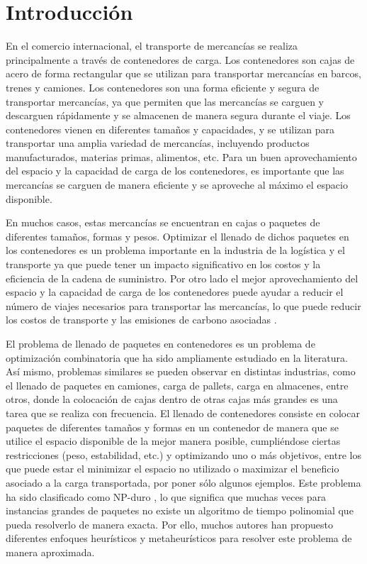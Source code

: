 \documentclass[openany]{article}
\begin{document}
\thispagestyle{empty}

\clearpage\thispagestyle{empty}\null\newpage %


\newpage




\section{Introducción} \label{sec: introducción}

En el comercio internacional, el transporte de mercancías se realiza principalmente a través de contenedores de carga. Los contenedores son cajas de acero de forma rectangular que se utilizan para transportar mercancías en barcos, trenes y camiones. Los contenedores son una forma eficiente y segura de transportar mercancías, ya que permiten que las mercancías se carguen y descarguen rápidamente y se almacenen de manera segura durante el viaje. Los contenedores vienen en diferentes tamaños y capacidades, y se utilizan para transportar una amplia variedad de mercancías, incluyendo productos manufacturados, materias primas, alimentos, etc. Para un buen aprovechamiento del espacio y la capacidad de carga de los contenedores, es importante que las mercancías se carguen de manera eficiente y se aproveche al máximo el espacio disponible.

En muchos casos, estas mercancías se encuentran en cajas o paquetes de diferentes tamaños, formas y pesos. Optimizar el llenado de dichos paquetes en los contenedores es un problema importante en la industria de la logística y el transporte ya que puede tener un impacto significativo en los costos y la eficiencia de la cadena de suministro. Por otro lado el mejor aprovechamiento del espacio y la capacidad de carga de los contenedores puede ayudar a reducir el número de viajes necesarios para transportar las mercancías, lo que puede reducir los costos de transporte y las emisiones de carbono asociadas \parencite{Parreo2008AMA}.

El problema de llenado de paquetes en contenedores es un problema de optimización combinatoria que ha sido ampliamente estudiado en la literatura. Así mismo, problemas similares se pueden observar en distintas industrias, como el llenado de paquetes en camiones, carga de pallets, carga en almacenes, entre otros, donde la colocación de cajas dentro de otras cajas más grandes es una tarea que se realiza con frecuencia. El llenado de contenedores consiste en colocar paquetes de diferentes tamaños y formas en un contenedor de manera que se utilice el espacio disponible de la mejor manera posible, cumpliéndose ciertas restricciones (peso, estabilidad, etc.) y optimizando uno o más objetivos, entre los que puede estar el minimizar el espacio no utilizado o maximizar el beneficio asociado a la carga transportada, por poner sólo algunos ejemplos. Este problema ha sido clasificado como NP-duro \parencite{PISINGER2002382}, lo que significa que muchas veces para instancias grandes de paquetes no existe un algoritmo de tiempo polinomial que pueda resolverlo de manera exacta. Por ello, muchos autores han propuesto diferentes enfoques heurísticos y metaheurísticos para resolver este problema de manera aproximada.
\end{document}
